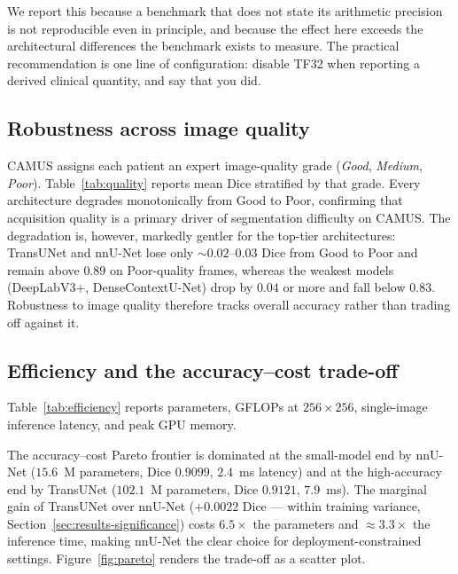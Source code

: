 We report this because a benchmark that does not state its arithmetic precision
is not reproducible even in principle, and because the effect here exceeds the
architectural differences the benchmark exists to measure. The practical
recommendation is one line of configuration: disable TF32 when reporting a
derived clinical quantity, and say that you did.

\subsection{Robustness across image quality}
\label{sec:results-robustness}

CAMUS assigns each patient an expert image-quality grade (\emph{Good},
\emph{Medium}, \emph{Poor}). Table~\ref{tab:quality} reports mean Dice
stratified by that grade. Every architecture degrades monotonically from
Good to Poor, confirming that acquisition quality is a primary driver of
segmentation difficulty on CAMUS. The degradation is, however, markedly
gentler for the top-tier architectures: TransUNet and nnU-Net lose only
$\sim$$0.02$--$0.03$ Dice from Good to Poor and remain above $0.89$ on
Poor-quality frames, whereas the weakest models (DeepLabV3+,
DenseContextU-Net) drop by $0.04$ or more and fall below $0.83$.
Robustness to image quality therefore tracks overall accuracy rather than
trading off against it.



\subsection{Efficiency and the accuracy--cost trade-off}
\label{sec:results-efficiency}

Table~\ref{tab:efficiency} reports parameters, GFLOPs at $256\times 256$,
single-image inference latency, and peak GPU memory.



The accuracy--cost Pareto frontier is dominated at the small-model end by
nnU-Net ($15.6$~M parameters, Dice $0.9099$, $2.4$~ms latency) and at the
high-accuracy end by TransUNet ($102.1$~M parameters, Dice $0.9121$,
$7.9$~ms). The marginal gain of TransUNet over nnU-Net ($+0.0022$ Dice ---
within training variance, Section~\ref{sec:results-significance}) costs
$6.5\times$ the parameters and $\approx 3.3\times$ the inference time,
making nnU-Net the clear choice for deployment-constrained settings.
Figure~\ref{fig:pareto} renders the trade-off as a scatter plot.

